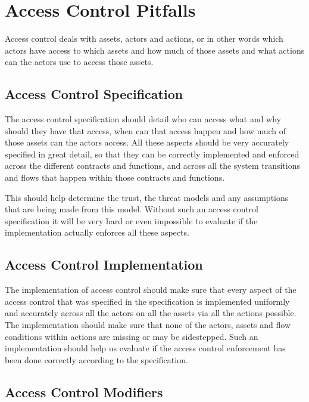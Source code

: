 \section{Access Control Pitfalls}\label{access-control-pitfalls}

Access control deals with assets, actors and actions, or in other words
which actors have access to which assets and how much of those assets
and what actions can the actors use to access those assets.

\subsection{Access Control
Specification}\label{access-control-specification}

The access control specification should detail who can access what and
why should they have that access, when can that access happen and how
much of those assets can the actors access. All these aspects should be
very accurately specified in great detail, so that they can be correctly
implemented and enforced across the different contracts and functions,
and across all the system transitions and flows that happen within those
contracts and functions.

This should help determine the trust, the threat models and any
assumptions that are being made from this model. Without such an access
control specification it will be very hard or even impossible to
evaluate if the implementation actually enforces all these aspects.

\subsection{Access Control
Implementation}\label{access-control-implementation}

The implementation of access control should make sure that every aspect
of the access control that was specified in the specification is
implemented uniformly and accurately across all the actors on all the
assets via all the actions possible. The implementation should make sure
that none of the actors, assets and flow conditions within actions are
missing or may be sidestepped. Such an implementation should help us
evaluate if the access control enforcement has been done correctly
according to the specification.

\subsection{Access Control Modifiers}\label{access-control-modifiers}

